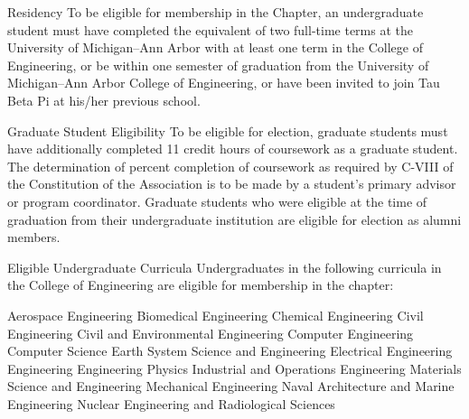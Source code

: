 \begin{enumsubsection}
\item{Residency} To be eligible for membership in the Chapter, an undergraduate student must have completed the equivalent of two full-time terms at the University of Michigan--Ann Arbor with at least one term in the College of Engineering, or be within one semester of graduation from the University of Michigan--Ann Arbor College of Engineering, or have been invited to join Tau Beta Pi at his/her previous school.
\item{Graduate Student Eligibility}\label{sec:grad_elig} To be eligible for election, graduate students must have additionally completed 11 credit hours of coursework as a graduate student. The determination of percent completion of coursework as required by C-VIII of the Constitution of the Association is to be made by a student's primary advisor or program coordinator. Graduate students who were eligible at the time of graduation from their undergraduate institution are eligible for election as alumni members.
\item{Eligible Undergraduate Curricula}\label{sec:ugrad_cur}  Undergraduates in the following curricula in the College of Engineering are eligible for membership in the chapter:

\let\oldenumi\labelenumii
\renewcommand{\labelenumii}{\arabic{enumii}.}
\begin{enumsubsubsection}

\itemnotoc Aerospace Engineering
\itemnotoc Biomedical Engineering
\itemnotoc Chemical Engineering
\itemnotoc Civil Engineering
\itemnotoc Civil and Environmental Engineering
\itemnotoc Computer Engineering
\itemnotoc Computer Science
\itemnotoc Earth System Science and Engineering
\itemnotoc Electrical Engineering
\itemnotoc Engineering
\itemnotoc Engineering Physics
\itemnotoc Industrial and Operations Engineering
\itemnotoc Materials Science and Engineering
\itemnotoc Mechanical Engineering
\itemnotoc Naval Architecture and Marine Engineering
\itemnotoc Nuclear Engineering and Radiological Sciences


\end{enumsubsubsection}
\end{enumsubsection}
